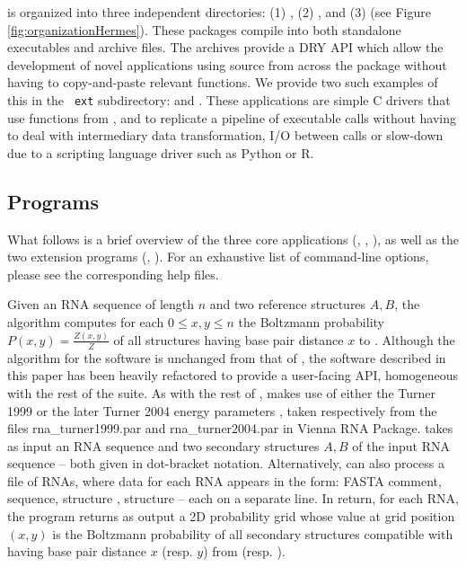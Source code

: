 \hermes is organized into three independent directories: (1)
\ffttwo, (2) \rnamfpt, and (3) \rnaeq (see
Figure \ref{fig:organizationHermes}). These packages compile into both
standalone executables and archive files. The archives provide a DRY
API which allow the development of novel applications using source
from across the \hermes package without having to copy-and-paste
relevant functions. We provide two such examples of this in the {\tt
ext} subdirectory: \fftmfpt and \ffteq. These applications
are simple C drivers that use functions from \ffttwo, \rnamfpt and
\rnaeq to replicate a pipeline of executable calls without having to
deal with intermediary data transformation, I/O between calls or
slow-down due to a scripting language driver such as Python or R.

\subsection{Programs}

What follows is a brief overview of the three core applications
(\ffttwo, \rnamfpt, \rnaeq), as well as the two extension
programs (\fftmfpt, \ffteq). For an exhaustive list of
command-line options, please see the corresponding help files.

Given an RNA sequence \seq of length $n$ and two reference
structures $A,B$, the algorithm \ffttwo \cite{Senter.jmb14}
computes for each $0 \leq x,y \leq n$ the Boltzmann probability
$P(x,y) = \frac{Z(x,y)}{Z}$ of all structures having base pair
distance $x$ to . Although the algorithm for the
software \ffttwo is unchanged from that of \cite{Senter.jmb14},
the software described in this
paper has been heavily refactored to provide a user-facing API,
homogeneous with the rest of the \hermes suite. As with the rest of
\hermes, \ffttwo makes use of either the Turner 1999 \cite{turner}
or the later Turner 2004 energy parameters
\cite{Turner.nar10}, taken respectively
from the files rna\_turner1999.par and  rna\_turner2004.par in Vienna
RNA Package. \ffttwo takes as input an RNA sequence \seq and two
secondary structures $A,B$ of the input RNA sequence -- both given
in dot-bracket
notation. Alternatively, \ffttwo can also process a file of RNAs,
where data for each RNA appears in the form: FASTA comment, sequence,
structure \strA, structure \strB -- each on a separate line. In return,
for each RNA, the program returns as output a 2D probability grid
whose value at
grid position $(x,y)$ is the Boltzmann probability of all secondary
structures compatible with \seq having base pair distance $x$ (resp.
$y$) from \strA (resp. \strB).

